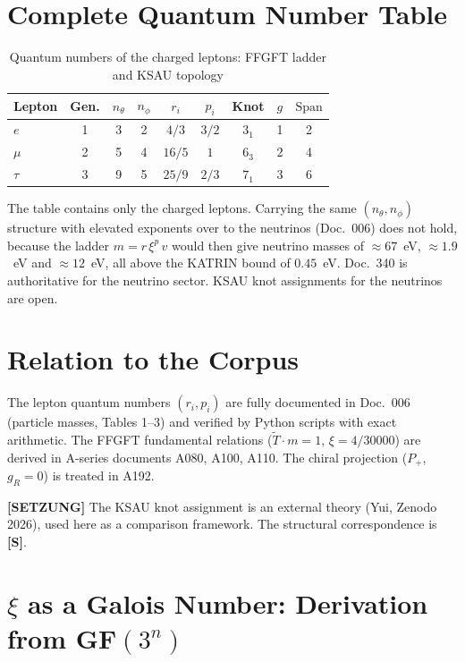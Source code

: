 \section{Complete Quantum Number Table}

\begin{table}[h]
\centering
\caption{Quantum numbers of the charged leptons: FFGFT ladder and KSAU topology}
\label{tab:complete_en}
\begin{tabular}{lcccccccc}
\toprule
Lepton & Gen. & $n_\theta$ & $n_\phi$ & $r_i$ & $p_i$ &
  Knot & $g$ & $\text{Span}$ \\
\midrule
$e$   & 1 & 3 & 2 & $4/3$  & $3/2$ & $3_1$ & 1 & 2 \\
$\mu$ & 2 & 5 & 4 & $16/5$ & $1$   & $6_3$ & 2 & 4 \\
$\tau$& 3 & 9 & 5 & $25/9$ & $2/3$ & $7_1$ & 3 & 6 \\
\bottomrule
\end{tabular}
\end{table}

The table contains only the charged leptons. Carrying the same
$(n_\theta, n_\phi)$ structure with elevated exponents over to the
neutrinos (Doc.~006) does not hold, because the ladder
$m = r\,\xi^{p}\,v$ would then give neutrino masses of $\approx 67$~eV,
$\approx 1.9$~eV and $\approx 12$~eV, all above the KATRIN bound of
$0.45$~eV. Doc.~340 is authoritative for the neutrino sector. KSAU knot
assignments for the neutrinos are open.

\section{Relation to the Corpus}

The lepton quantum numbers $(r_i, p_i)$ are fully documented in
Doc.~006 (particle masses, Tables 1--3) and verified by Python
scripts with exact arithmetic. The FFGFT fundamental relations
($\tilde{T}\cdot m = 1$, $\xi = 4/30000$) are derived in A-series
documents A080, A100, A110. The chiral projection ($P_+$, $g_R = 0$)
is treated in A192.

\textbf{[SETZUNG]} The KSAU knot assignment is an external theory
(Yui, Zenodo 2026), used here as a comparison framework.
The structural correspondence is \textbf{[S]}.

\section{$\xi$ as a Galois Number: Derivation from GF$(3^n)$}
\label{sec:xi_galois}

